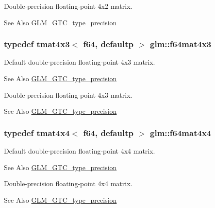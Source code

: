 Double-\/precision floating-\/point 4x2 matrix. \begin{DoxySeeAlso}{See Also}
\hyperlink{group__gtc__type__precision}{G\-L\-M\-\_\-\-G\-T\-C\-\_\-type\-\_\-precision} 
\end{DoxySeeAlso}
\hypertarget{group__gtc__type__precision_gab10a195a85f65da47bf70438f57a8a3c}{
\subsubsection[{f64mat4x3}]{\setlength{\rightskip}{0pt plus 5cm}typedef tmat4x3$<$ f64, defaultp $>$ {\bf glm\-::f64mat4x3}}}\label{group__gtc__type__precision_gab10a195a85f65da47bf70438f57a8a3c}
Default double-\/precision floating-\/point 4x3 matrix. \begin{DoxySeeAlso}{See Also}
\hyperlink{group__gtc__type__precision}{G\-L\-M\-\_\-\-G\-T\-C\-\_\-type\-\_\-precision}
\end{DoxySeeAlso}
Double-\/precision floating-\/point 4x3 matrix. \begin{DoxySeeAlso}{See Also}
\hyperlink{group__gtc__type__precision}{G\-L\-M\-\_\-\-G\-T\-C\-\_\-type\-\_\-precision} 
\end{DoxySeeAlso}
\hypertarget{group__gtc__type__precision_ga6b1ada50de2fc7d991138ab857fb2476}{
\subsubsection[{f64mat4x4}]{\setlength{\rightskip}{0pt plus 5cm}typedef tmat4x4$<$ f64, defaultp $>$ {\bf glm\-::f64mat4x4}}}\label{group__gtc__type__precision_ga6b1ada50de2fc7d991138ab857fb2476}
Default double-\/precision floating-\/point 4x4 matrix. \begin{DoxySeeAlso}{See Also}
\hyperlink{group__gtc__type__precision}{G\-L\-M\-\_\-\-G\-T\-C\-\_\-type\-\_\-precision}
\end{DoxySeeAlso}
Double-\/precision floating-\/point 4x4 matrix. \begin{DoxySeeAlso}{See Also}
\hyperlink{group__gtc__type__precision}{G\-L\-M\-\_\-\-G\-T\-C\-\_\-type\-\_\-precision} 
\end{DoxySeeAlso}
